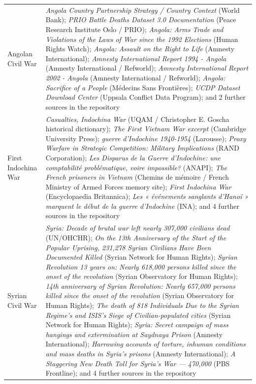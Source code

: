 \documentclass[11pt]{article}
\begin{document}
\begin{scriptsize}
\begin{longtable}{p{3.5cm} p{12.5cm}}
\addlinespace
Angolan Civil War & \emph{Angola Country Partnership Strategy / Country Context} (World Bank); \emph{PRIO Battle Deaths Dataset 3.0 Documentation} (Peace Research Institute Oslo / PRIO); \emph{Angola: Arms Trade and Violations of the Laws of War since the 1992 Elections} (Human Rights Watch); \emph{Angola: Assault on the Right to Life} (Amnesty International); \emph{Amnesty International Report 1994 - Angola} (Amnesty International / Refworld); \emph{Amnesty International Report 2002 - Angola} (Amnesty International / Refworld); \emph{Angola: Sacrifice of a People} (Médecins Sans Frontières); \emph{UCDP Dataset Download Center} (Uppsala Conflict Data Program); and 2 further sources in the repository \\
\addlinespace
First Indochina War & \emph{Casualties, Indochina War} (UQAM / Christopher E. Goscha historical dictionary); \emph{The First Vietnam War excerpt} (Cambridge University Press); \emph{guerre d'Indochine 1940-1954} (Larousse); \emph{Proxy Warfare in Strategic Competition: Military Implications} (RAND Corporation); \emph{Les Disparus de la Guerre d'Indochine: une comptabilité problématique, voire impossible?} (ANAPI); \emph{The French prisoners in Vietnam} (Chemins de mémoire / French Ministry of Armed Forces memory site); \emph{First Indochina War} (Encyclopaedia Britannica); \emph{Les « événements sanglants d'Hanoï » marquent le début de la guerre d'Indochine} (INA); and 4 further sources in the repository \\
\addlinespace
Syrian Civil War & \emph{Syria: Decade of brutal war left nearly 307,000 civilians dead} (UN/OHCHR); \emph{On the 13th Anniversary of the Start of the Popular Uprising, 231,278 Syrian Civilians Have Been Documented Killed} (Syrian Network for Human Rights); \emph{Syrian Revolution 13 years on: Nearly 618,000 persons killed since the onset of the revolution} (Syrian Observatory for Human Rights); \emph{14th anniversary of Syrian Revolution: Nearly 657,000 persons killed since the onset of the revolution} (Syrian Observatory for Human Rights); \emph{The death of 818 Individuals Due to the Syrian Regime’s and ISIS’s Siege of Civilian-populated cities} (Syrian Network for Human Rights); \emph{Syria: Secret campaign of mass hangings and extermination at Saydnaya Prison} (Amnesty International); \emph{Harrowing accounts of torture, inhuman conditions and mass deaths in Syria’s prisons} (Amnesty International); \emph{A Staggering New Death Toll for Syria’s War — 470,000} (PBS Frontline); and 4 further sources in the repository \\

\end{longtable}
\end{scriptsize}
\end{document}
